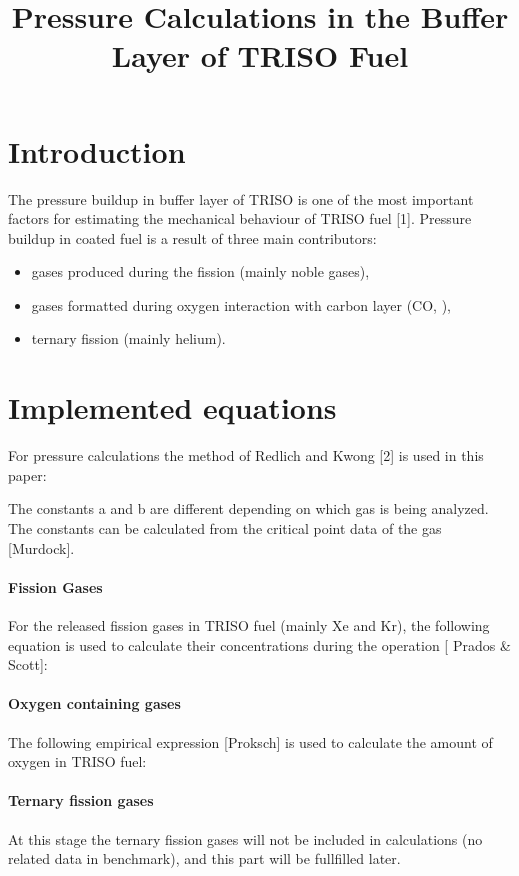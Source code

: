 \documentclass[review]{elsarticle}
\begin{document}
\begin{frontmatter}

\title{Pressure Calculations in the Buffer Layer of TRISO Fuel}

\end{frontmatter}


\section{Introduction} The pressure buildup in buffer layer of TRISO is one of the most important factors for estimating the mechanical behaviour of TRISO  fuel [1]. Pressure buildup in coated fuel is a result of three main contributors: 
\begin{itemize}
\item gases produced during the fission (mainly noble gases), 
\item gases formatted during oxygen interaction with carbon layer (CO, ), 
\item ternary fission (mainly helium).
\end{itemize}

\section{Implemented equations}
For pressure calculations the method of Redlich and Kwong [2] is used in this paper: 

\PressureRK

The constants a and b are different depending on which gas is being analyzed. The constants can be calculated from the critical point data of the gas [Murdock].

\paragraph{Fission Gases} For the released fission gases in TRISO fuel (mainly Xe and Kr), the following equation is used to calculate their concentrations during the operation [ Prados \& Scott]:

\NumDenFGs

\paragraph{Oxygen containing gases} The following empirical expression [Proksch] is used to calculate the amount of oxygen in TRISO fuel:

\PressureProksh 

\paragraph{Ternary fission gases} At this stage the ternary fission gases will not be included in calculations (no related data in benchmark), and this part will be fullfilled later.
\end{document}
